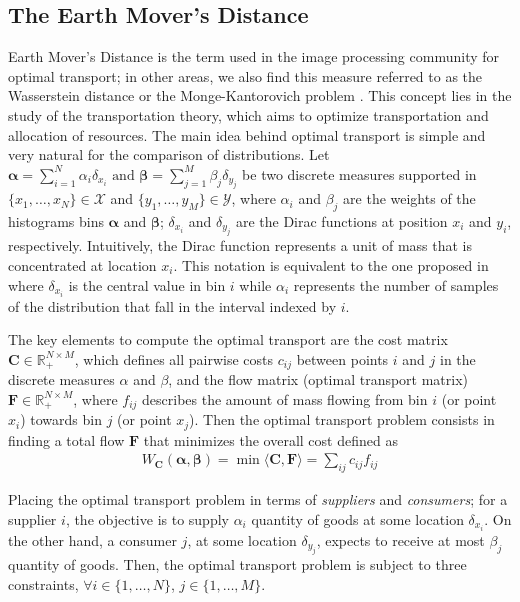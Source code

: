 \subsection{The Earth Mover's Distance}\label{subsec:EMD}
Earth Mover's Distance is the term used in the image processing community for optimal transport; in other areas, we also find this measure referred to as the Wasserstein distance \citep{Gibbs.Su:ISR:2002} or the Monge-Kantorovich problem \citep{Bogachev.Kolesnikov:RMS:2012, Kantorovich:JMS:2006}. This concept lies in the study of the transportation theory, which aims to optimize transportation and allocation of resources. The main idea behind optimal transport is simple and very natural for the comparison of distributions. 
Let
$
\boldsymbol{\alpha} = \sum_{i=1}^{N}\alpha_{i}\delta_{x_i} \text{  and  } \boldsymbol{\beta} = \sum_{j=1}^{M}\beta_{j}\delta_{y_j}
$
be two discrete measures supported in $\{x_1, \ldots, x_N\} \in \mathcal{X}$ and $\{y_1, \ldots, y_M\} \in \mathcal{Y}$, where $\alpha_i$ and $\beta_j$ are the weights of the histograms bins $\boldsymbol{\alpha}$ and $\boldsymbol{\beta}$; $\delta_{x_i}$ and $\delta_{y_j}$ are the Dirac functions at position $x_i$ and $y_i$, respectively. Intuitively, the Dirac function represents a unit of mass that is concentrated at location $x_i$. This notation is equivalent to the one proposed in \citep{Rubner.Tomasi.ea:IJCV:2000} where $\delta_{x_i}$ is the central value in bin $i$ while $\alpha_i$ represents the number of samples of the distribution that fall in the interval indexed by $i$.

The key elements to compute the optimal transport are the cost matrix $\mathbf{C} \in \mathbb{R}^{N\times M}_+$, which defines all pairwise costs $c_{ij}$ between points $i$ and $j$ in the discrete measures $\alpha$ and $\beta$, and the flow matrix (optimal transport matrix) $\mathbf{F} \in \mathbb{R}^{N\times M}_+$, where $f_{ij}$ describes the amount of mass flowing from bin $i$ (or point $x_i$) towards bin $j$ (or point $x_j$). Then the optimal transport problem consists in finding a total flow $\mathbf{F}$ that minimizes the overall cost defined as
\begin{eqnarray}
W_{\mathbf{C}}(\boldsymbol{\alpha}, \boldsymbol{\beta}) = \min \langle\mathbf{C},\mathbf{F}\rangle = \sum\nolimits_{ij} c_{ij}f_{ij}
\label{eq:optimal_work}
\end{eqnarray}

Placing the optimal transport problem in terms of \textit{suppliers} and \textit{consumers}; for a supplier $i$, the objective is to supply $\alpha_i$ quantity of goods at some location $\delta_{x_i}$. On the other hand, a consumer $j$, at some location $\delta_{y_j}$, expects to receive at most $\beta_j$ quantity of goods. Then, the optimal transport problem is subject to three constraints, $\forall i \in\{1, \ldots, N\}$, $j \in\{1, \ldots, M\}$.

